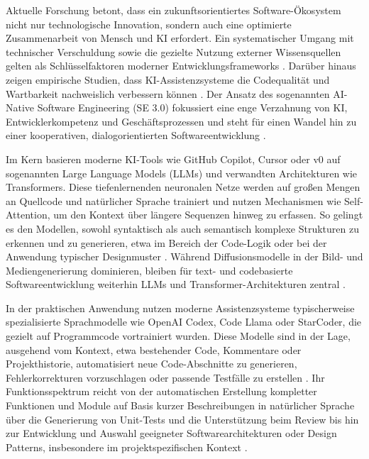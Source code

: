 
\label{sec:wichtige-algorithmen-modelle}

Aktuelle Forschung betont, dass ein zukunftsorientiertes Software-Ökosystem
nicht nur technologische Innovation, sondern auch eine optimierte
Zusammenarbeit von Mensch und KI erfordert. Ein systematischer Umgang mit
technischer Verschuldung sowie die gezielte Nutzung externer Wissensquellen
gelten als Schlüsselfaktoren moderner Entwicklungsframeworks
\cite{matsumoto_conceptual_2021}. Darüber hinaus zeigen empirische Studien,
dass KI-Assistenzsysteme die Codequalität und Wartbarkeit nachweislich
verbessern können \cite{martinovic_impact_2024}. Der Ansatz des sogenannten
\glqq AI-Native Software Engineering\grqq{} (SE 3.0) fokussiert eine enge
Verzahnung von KI, Entwicklerkompetenz und Geschäftsprozessen und steht für
einen Wandel hin zu einer kooperativen, dialogorientierten Softwareentwicklung
\cite{hassan_towards_2024}.

Im Kern basieren moderne KI-Tools wie GitHub Copilot, Cursor oder v0 auf
sogenannten Large Language Models (LLMs) und verwandten Architekturen wie
Transformers. Diese tiefenlernenden neuronalen Netze werden auf großen Mengen
an Quellcode und natürlicher Sprache trainiert und nutzen Mechanismen wie
Self-Attention, um den Kontext über längere Sequenzen hinweg zu erfassen. So
gelingt es den Modellen, sowohl syntaktisch als auch semantisch komplexe
Strukturen zu erkennen und zu generieren, etwa im Bereich der Code-Logik oder
bei der Anwendung typischer Designmuster \cite{nguyen-duc_generative_2023,
    esposito_generative_2025}. Während Diffusionsmodelle in der Bild- und
Mediengenerierung dominieren, bleiben für text- und codebasierte
Softwareentwicklung weiterhin LLMs und Transformer-Architekturen zentral
\cite{weisz_design_2024}.

In der praktischen Anwendung nutzen moderne Assistenzsysteme typischerweise
spezialisierte Sprachmodelle wie OpenAI Codex, Code Llama oder StarCoder, die
gezielt auf Programmcode vortrainiert wurden. Diese Modelle sind in der Lage,
ausgehend vom Kontext, etwa bestehender Code, Kommentare oder Projekthistorie,
automatisiert neue Code-Abschnitte zu generieren, Fehlerkorrekturen
vorzuschlagen oder passende Testfälle zu erstellen \cite{coutinho_role_2024,
    esposito_generative_2025}. Ihr Funktionsspektrum reicht von der automatischen
Erstellung kompletter Funktionen und Module auf Basis kurzer Beschreibungen in
natürlicher Sprache über die Generierung von Unit-Tests und die Unterstützung
beim Review bis hin zur Entwicklung und Auswahl geeigneter
Softwarearchitekturen oder Design Patterns, insbesondere im projektspezifischen
Kontext \cite{coutinho_role_2024, esposito_generative_2025, donvir_role_2024}.

